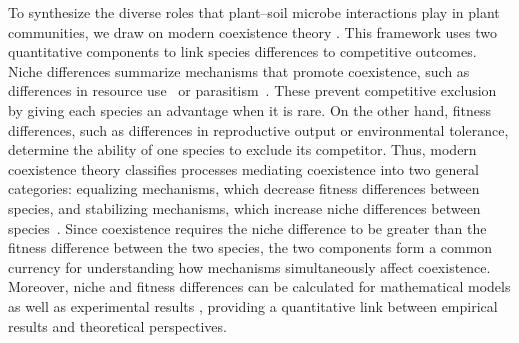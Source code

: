 To synthesize the diverse roles that plant--soil microbe interactions play in plant communities, we draw on modern coexistence theory \citep{Chesson1990, Chesson2000, Chesson2008}. This framework uses two quantitative components to link species differences to competitive outcomes.
Niche differences summarize mechanisms that promote coexistence, such as differences in resource use~\citep{Chesson1990} or parasitism~\citep{Chesson2008}. These prevent competitive exclusion by giving each species an advantage when it is rare. On the other hand, fitness differences, such as differences in reproductive output or environmental tolerance, determine the ability of one species to exclude its competitor.
Thus, modern coexistence theory classifies processes mediating coexistence into two general categories: equalizing mechanisms, which decrease fitness differences between species, and stabilizing mechanisms, which increase niche differences between species~\citep{Chesson2000, Adler2007, HilleRisLambers2012}.
Since coexistence requires the niche difference to be greater than the fitness difference between the two species, the two components form a common currency for understanding how mechanisms simultaneously affect coexistence.
Moreover, niche and fitness differences can be calculated for mathematical models \citep{Chesson2008} as well as experimental results \citep{Godoy2014, Gross2015, Kraft2015}, providing a quantitative link between empirical results and theoretical perspectives.
\par


